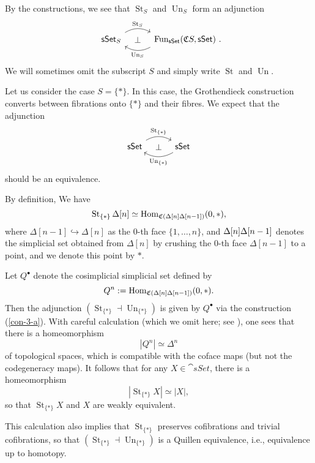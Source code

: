 By the constructions, we see that $\operatorname{St}_S$ and $\operatorname{Un}_S$
form an adjunction
\[\begin{tikzcd}[column sep=3em]
    \cat{sSet}_{\/S}\ar[r,bend left,start anchor=north east,end anchor=north west,"\operatorname{St}_S"]
    \ar[r,phantom,"\bot"] &
    \operatorname{Fun}_{\cat{sSet}}(\mathfrak CS,\cat{sSet})\rlap{\ .}
    \ar[l,bend left,start anchor=south west,end anchor=south east,"\operatorname{Un}_S"]
\end{tikzcd}\]
We will sometimes omit the subscript $S$ and simply write
$\operatorname{St}$ and $\operatorname{Un}$.

\begin{example} \label{eg-5-pt}
    Let us consider the case $S=\{*\}$.
    In this case, the Grothendieck construction converts between
    fibrations onto $\{*\}$ and their fibres. We expect that the adjunction 
    \[\begin{tikzcd}[column sep=3em]
        \cat{sSet}\ar[r,bend left,"\operatorname{St}_{\{*\}}"]
        \ar[r,phantom,"\bot"] &
        \cat{sSet}
        \ar[l,bend left,"\operatorname{Un}_{\{*\}}"]
    \end{tikzcd}\]
    should be an equivalence.
    
    By definition, We have 
    \[ \operatorname{St}_{\{*\}}\Delta[n]\simeq\operatorname{Hom}_{\mathfrak C(\Delta[n]\/\Delta[n-1])}(0,*), \]
    where $\Delta[n-1]\hookrightarrow\Delta[n]$ as the $0$-th face $\{1,\dotsc,n\}$,
    and $\Delta[n]\/\Delta[n-1]$ denotes the simplicial set
    obtained from $\Delta[n]$ by crushing the $0$-th face $\Delta[n-1]$ to a point,
    and we denote this point by $*$.

    Let $Q^\bullet$ denote the cosimplicial simplicial set defined by 
    \[ Q^n:=\operatorname{Hom}_{\mathfrak C(\Delta[n]\/\Delta[n-1])}(0,*). \]
    Then the adjunction
    $(\operatorname{St}_{\{*\}}\dashv\operatorname{Un}_{\{*\}})$
    is given by $Q^\bullet$ via the construction (\ref{con-3-a}).
    With careful calculation (which we omit here; see \cite[Remark~2.2.2.6]{htt}),
    one sees that there is a homeomorphism
    \[ |Q^n|\simeq\Delta^n \]
    of topological spaces, which is compatible with the coface maps (but not the codegeneracy maps).
    It follows that for any $X\in\cat{sSet}$, there is a homeomorphism
    \[ |{\operatorname{St}_{\{*\}}X}|\simeq|X|, \]
    so that $\operatorname{St}_{\{*\}}X$ and $X$ are weakly equivalent.

    This calculation also implies that
    $\operatorname{St}_{\{*\}}$ preserves cofibrations and trivial cofibrations,
    so that $(\operatorname{St}_{\{*\}}\dashv\operatorname{Un}_{\{*\}})$
    is a Quillen equivalence, i.e., equivalence up to homotopy. \varqed
\end{example}

